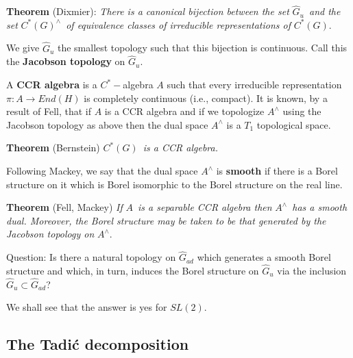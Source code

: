 {\bf Theorem} (Dixmier): {\em There is a canonical bijection between the set 
}$\hat G_u${\em \ and the set }$C^{*}(G)^{\wedge }${\em \ of equivalence
classes of irreducible representations of }$C^{*}(G).$

We give $\hat G_u$ the smallest topology such that this bijection is
continuous. Call this the {\bf Jacobson topology} on $\hat G_u.$

A {\bf CCR algebra} is a $C^{*}-$algebra $A$ such that every irreducible
representation $\pi :A\rightarrow End(H)$ is completely continuous (i.e.,
compact). It is known, by a result of Fell, that if $A$ is a CCR algebra and
if we topologize $A^{\wedge }$ using the Jacobson topology as above then the
dual space $A^{\wedge }$ is a $T_1$ topological space.

{\bf Theorem} (Bernstein) $C^{*}(G)${\em \ is a CCR algebra.}

Following Mackey, we say that the dual space $A^{\wedge }$ is {\bf smooth}
if there is a Borel structure on it which is Borel isomorphic to the Borel
structure on the real line.

{\bf Theorem} (Fell, Mackey) {\em If }$A${\em \ is a separable CCR algebra
then }$A^{\wedge }${\em \ has a smooth dual. Moreover, the Borel structure
may be taken to be that generated by the Jacobson topology on }$A^{\wedge }.$

{\sc Question}: Is there a natural topology on $\hat G_{ad}$ which generates
a smooth Borel structure and which, in turn, induces the Borel structure on $%
\hat G_u$ via the inclusion $\hat G_u\subset \hat G_{ad}$?

We shall see that the answer is yes for $SL(2).$

\subsection{The Tadi\'c decomposition}

